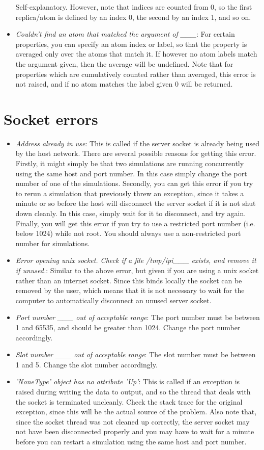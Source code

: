 \documentclass[11pt,english,fleqn]{report}
\begin{document}
\begin{itemize}
Self-explanatory. However, note that indices are counted from 0, so
the first replica/atom is defined by an index 0, the second by an
index 1, and so on.
\item \emph{Couldn't find an atom that matched the argument of \_\_\_}:
For certain properties, you can specify an atom index or label, so
that the property is averaged only over the atoms that match it. If
however no atom labels match the argument given, then the average
will be undefined. Note that for properties which are cumulatively
counted rather than averaged, this error is not raised, and if no
atom matches the label given 0 will be returned.
\end{itemize}

\section{Socket errors}
\begin{itemize}
\item \emph{Address already in use}: This is called if the server socket
is already being used by the host network. There are several possible
reasons for getting this error. Firstly, it might simply be that two
simulations are running concurrently using the same host and port
number. In this case simply change the port number of one of the simulations.
Secondly, you can get this error if you try to rerun a simulation
that previously threw an exception, since it takes a minute or so
before the host will disconnect the server socket if it is not shut
down cleanly. In this case, simply wait for it to disconnect, and
try again. Finally, you will get this error if you try to use a restricted
port number (i.e. below 1024) while not root. You should always use
a non-restricted port number for \ipi simulations.
\item \emph{Error opening unix socket. Check if a file /tmp/ipi\_\_\_ exists, and remove it if unused.}:
Similar to the above error, but given if you are using a unix socket
rather than an internet socket. Since this binds locally the socket
can be removed by the user, which means that it is not necessary to
wait for the computer to automatically disconnect an unused server
socket. 
\item \emph{Port number \_\_\_ out of acceptable range}: The port number
must be between 1 and 65535, and should be greater than 1024. Change
the port number accordingly.
\item \emph{Slot number \_\_\_ out of acceptable range}: The slot number
must be between 1 and 5. Change the slot number accordingly.
\item \emph{'NoneType' object has no attribute 'Up'}: This is called if
an exception is raised during writing the data to output, and so the
thread that deals with the socket is terminated uncleanly. Check the
stack trace for the original exception, since this will be the actual
source of the problem. Also note that, since the socket thread was
not cleaned up correctly, the server socket may not have been disconnected
properly and you may have to wait for a minute before you can restart
a simulation using the same host and port number.
\end{itemize}
\end{document}
